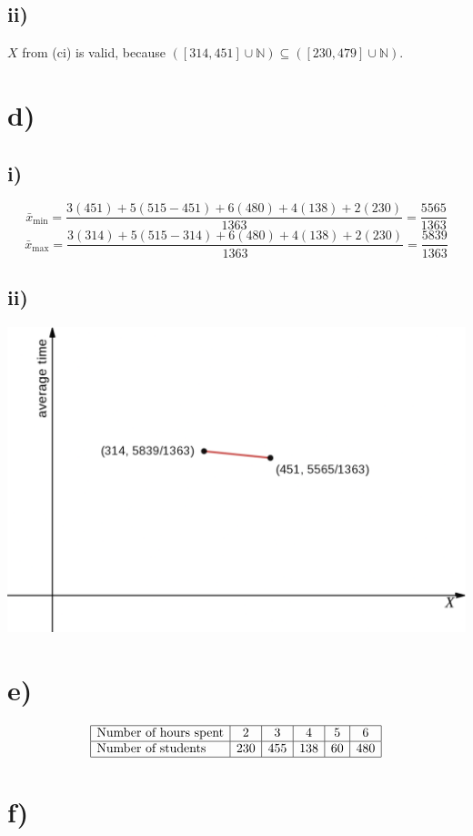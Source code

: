 \documentclass[a4paper]{article}
\begin{document}
\subsection*{ii)}
\(X\) from (ci) is valid, because \(([314,451]\cup\mathbb N)\subseteq([230,479]\cup\mathbb N)\).


\section*{d)}
\subsection*{i)}
\[{\bar x}_{\min}=\frac{3(451)+5(515-451)+6(480)+4(138)+2(230)}{1363}=\boxed{\frac{5565}{1363}}\]
\[{\bar x}_{\max}=\frac{3(314)+5(515-314)+6(480)+4(138)+2(230)}{1363}=\boxed{\frac{5839}{1363}}\]

\subsection*{ii)}
\includegraphics[width=\textwidth]{trivial.png.png}

\section*{e)}
\[\begin{array}{|l|c|c|c|c|c|}
    \hline
    \text{Number of hours spent}&2&3&4&5&6\\
    \hline
    \text{Number of students}&230&455&138&60&480\\
    \hline
\end{array}\]

\section*{f)}
\end{document}
